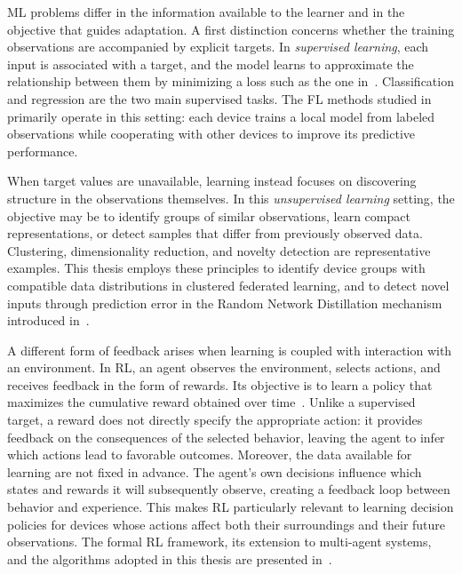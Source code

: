 \gls{ML} problems differ in the information available to the learner
 and in the objective that guides adaptation.
%
A first distinction concerns whether the training observations
 are accompanied by explicit targets.
%
In \emph{supervised learning}, each input is associated with a target,
 and the model learns to approximate the relationship between them
 by minimizing a loss such as the one in~.
%
Classification and regression are the two main supervised tasks.
%
The \gls{FL} methods studied in~
 primarily operate in this setting:
 each device trains a local model from labeled observations
 while cooperating with other devices to improve its predictive performance.

When target values are unavailable,
 learning instead focuses on discovering structure in the observations themselves.
%
In this \emph{unsupervised learning} setting,
 the objective may be to identify groups of similar observations,
 learn compact representations,
 or detect samples that differ from previously observed data.
%
Clustering, dimensionality reduction, and novelty detection
 are representative examples.
%
This thesis employs these principles to identify device groups
 with compatible data distributions in clustered federated learning,
 and to detect novel inputs through prediction error
 in the Random Network Distillation mechanism
 introduced in~.

A different form of feedback arises when learning is coupled
 with interaction with an environment.
%
In \gls{RL},
 an agent observes the environment, selects actions,
 and receives feedback in the form of rewards.
%
Its objective is to learn a policy that maximizes
 the cumulative reward obtained over time~\cite{DBLP:books/lib/SuttonB2018}.
%
Unlike a supervised target,
 a reward does not directly specify the appropriate action:
 it provides feedback on the consequences of the selected behavior,
 leaving the agent to infer which actions lead to favorable outcomes.
%
Moreover, the data available for learning are not fixed in advance.
%
The agent's own decisions influence which states and rewards
 it will subsequently observe,
 creating a feedback loop between behavior and experience.
%
This makes \gls{RL} particularly relevant to learning decision policies
 for devices whose actions affect both their surroundings
 and their future observations.
%
The formal \gls{RL} framework,
 its extension to multi-agent systems,
 and the algorithms adopted in this thesis
 are presented in~.


